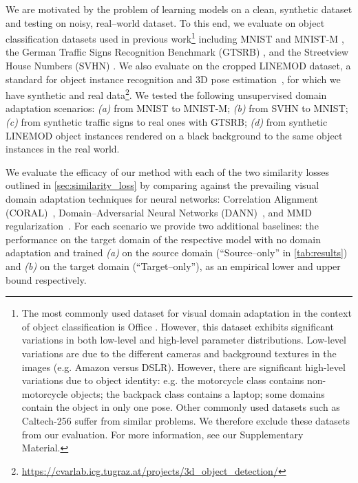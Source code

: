 \documentclass{article}
\begin{document}
We are motivated by the problem of learning models on a clean, synthetic dataset and testing on
noisy, real–world dataset. To this end, we evaluate on object classification datasets used in previous work\footnote{The most commonly used dataset for visual domain adaptation in the context of object classification is Office \cite{saenko2010adapting}. However, this dataset exhibits significant variations in both low-level and high-level parameter distributions. Low-level variations are due to the different cameras and background textures in the images (e.g. Amazon versus DSLR). However, there are significant high-level variations due to object identity: e.g. the motorcycle class contains non-motorcycle objects; the backpack class contains a laptop; some domains contain the object in only one pose. Other commonly used datasets such as Caltech-256 suffer from similar problems. We therefore exclude these datasets from our evaluation. For more information, see our Supplementary Material.}
including MNIST and {MNIST-M} \cite{ganin2016domain}, the German Traffic Signs
Recognition Benchmark (GTSRB) \cite{stallkamp2012gtsrb}, and the Streetview
House Numbers (SVHN) \cite{netzer2011reading}. We also evaluate on the cropped
LINEMOD dataset, a standard for object instance
recognition and 3D pose 
estimation~\cite{hinterstoisser2012accv,wohlhart2015learning}, for which we have
synthetic and real data\footnote{\url{https://cvarlab.icg.tugraz.at/projects/3d_object_detection/}}.
We tested the following unsupervised domain adaptation scenarios: \textsl{(a)} from MNIST to MNIST-M; \textsl{(b)} from SVHN to MNIST; \textsl{(c)} from synthetic traffic signs to real ones with GTSRB; \textsl{(d)} from synthetic LINEMOD object instances rendered on a black background to the same object instances in the real world.

We evaluate the efficacy of our method with each of the two similarity losses outlined in \autoref{sec:similarity_loss} by comparing against the prevailing visual domain adaptation techniques for neural networks: Correlation Alignment (CORAL)~\cite{sun2015return},  Domain--Adversarial Neural Networks (DANN)~\cite{ganin2014unsupervised,ganin2016domain}, and MMD regularization~\cite{tzeng2015ddc,long2015learning}. 
For each scenario we provide two additional baselines: the performance on the target domain of the respective model with no domain adaptation and trained \textsl{(a)} on the source domain (``Source--only'' in \autoref{tab:results}) and \textsl{(b)} on the target domain (``Target--only''), as an empirical lower and upper bound respectively. 
\end{document}
